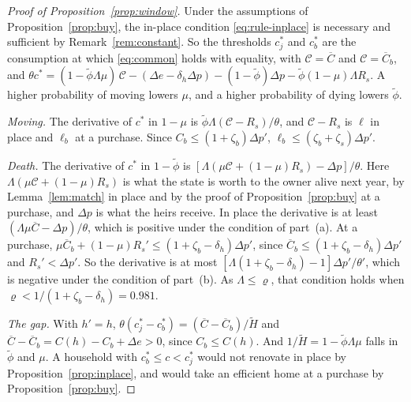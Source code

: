\begin{proof}[Proof of Proposition~\ref{prop:window}]
Under the assumptions of Proposition~\ref{prop:buy}, the in-place condition
\eqref{eq:rule-inplace} is necessary and sufficient by
Remark~\ref{rem:constant}. So the thresholds $c_j^*$ and $c_b^*$ are the
consumption at which \eqref{eq:common} holds with equality, with
$\mathcal C=\overline C$ and $\mathcal C=\overline C_b$, and
$\theta c^*=(1-\tilde\phi\Lambda\mu)\,\mathcal C-(\Delta e-\delta_h\Delta p)
-(1-\tilde\phi)\Delta p-\tilde\phi(1-\mu)\Lambda R_s$.
A higher probability of moving lowers $\mu$, and a higher probability of
dying lowers $\tilde\phi$.

\emph{Moving.} The derivative of $c^*$ in $1-\mu$ is
$\tilde\phi\Lambda(\mathcal C-R_s)/\theta$, and $\mathcal C-R_s$ is $\ell$
in place and $\ell_b$ at a purchase. Since $C_b\le(1+\zeta_b)\Delta p'$,
$\ell_b\le(\zeta_b+\zeta_s)\Delta p'$.

\emph{Death.} The derivative of $c^*$ in $1-\tilde\phi$ is
$[\Lambda(\mu\mathcal C+(1-\mu)R_s)-\Delta p]/\theta$. Here
$\Lambda(\mu\mathcal C+(1-\mu)R_s)$ is what the state is worth to the owner
alive next year, by Lemma~\ref{lem:match} in place and by the proof of
Proposition~\ref{prop:buy} at a purchase, and $\Delta p$ is what the heirs
receive. In place the derivative is at least
$(\Lambda\mu\overline C-\Delta p)/\theta$, which is positive under the
condition of part~(a). At a purchase,
$\mu\overline C_b+(1-\mu)R_s'\le(1+\zeta_b-\delta_h)\Delta p'$, since
$\overline C_b\le(1+\zeta_b-\delta_h)\Delta p'$ and $R_s'<\Delta p'$. So
the derivative is at most $[\Lambda(1+\zeta_b-\delta_h)-1]\Delta p'/\theta'$,
which is negative under the condition of part~(b). As $\Lambda\le\varrho$,
that condition holds when $\varrho<1/(1+\zeta_b-\delta_h)=0.981$.

\emph{The gap.} With $h'=h$,
$\theta(c^*_j-c^*_b)=(\overline C-\overline C_b)/\widetilde H$ and
$\overline C-\overline C_b=C(h)-C_b+\Delta e>0$, since $C_b\le C(h)$. And
$1/\widetilde H=1-\tilde\phi\Lambda\mu$ falls in $\tilde\phi$ and $\mu$. A
household with $c_b^*\le c<c_j^*$ would not renovate in place by
Proposition~\ref{prop:inplace}, and would take an efficient home at a
purchase by Proposition~\ref{prop:buy}.
\end{proof}

